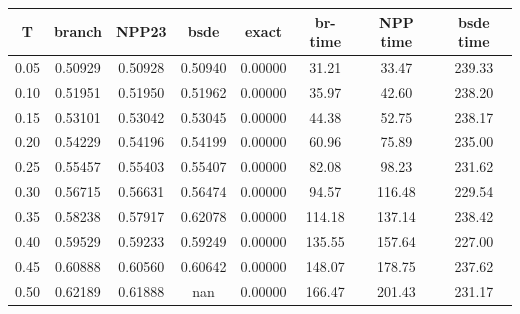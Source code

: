 \begin{tabular}{cccccccc}
\toprule
T & branch & NPP23 & bsde & exact & br-time & NPP time & bsde time \\
\midrule
0.05 & 0.50929 & 0.50928 & 0.50940 & 0.00000 & 31.21 & 33.47 & 239.33 \\
0.10 & 0.51951 & 0.51950 & 0.51962 & 0.00000 & 35.97 & 42.60 & 238.20 \\
0.15 & 0.53101 & 0.53042 & 0.53045 & 0.00000 & 44.38 & 52.75 & 238.17 \\
0.20 & 0.54229 & 0.54196 & 0.54199 & 0.00000 & 60.96 & 75.89 & 235.00 \\
0.25 & 0.55457 & 0.55403 & 0.55407 & 0.00000 & 82.08 & 98.23 & 231.62 \\
0.30 & 0.56715 & 0.56631 & 0.56474 & 0.00000 & 94.57 & 116.48 & 229.54 \\
0.35 & 0.58238 & 0.57917 & 0.62078 & 0.00000 & 114.18 & 137.14 & 238.42 \\
0.40 & 0.59529 & 0.59233 & 0.59249 & 0.00000 & 135.55 & 157.64 & 227.00 \\
0.45 & 0.60888 & 0.60560 & 0.60642 & 0.00000 & 148.07 & 178.75 & 237.62 \\
0.50 & 0.62189 & 0.61888 & nan & 0.00000 & 166.47 & 201.43 & 231.17 \\
\bottomrule
\end{tabular}
